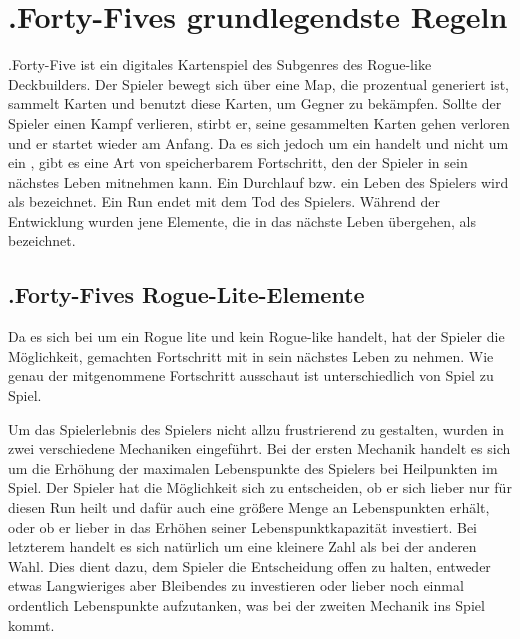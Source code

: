 
\section{.Forty-Fives grundlegendste Regeln}\label{sec:grundlegenste-regeln}

\renewcommand{\kapitelautor}{Autor: Philip Jankovic} %

%
.Forty-Five ist ein digitales Kartenspiel des Subgenres des Rogue-like Deckbuilders. %
Der Spieler bewegt sich über eine Map, die prozentual generiert ist, sammelt Karten und benutzt diese Karten,
um Gegner zu bekämpfen. Sollte der Spieler einen Kampf verlieren, stirbt er, seine gesammelten Karten
gehen verloren und er startet wieder am Anfang. Da es sich jedoch um ein  handelt und nicht um ein ,
gibt es eine Art von speicherbarem Fortschritt, den der Spieler in sein nächstes Leben mitnehmen kann.
Ein Durchlauf bzw. ein Leben des Spielers wird als  bezeichnet. Ein Run endet mit dem Tod des Spielers.
Während der Entwicklung wurden jene Elemente, die in das nächste Leben übergehen, als  bezeichnet.



\subsection{.Forty-Fives Rogue-Lite-Elemente}\label{rogue_lite_elemente}

Da es sich bei \FF um ein Rogue lite und kein Rogue-like handelt, hat der Spieler die Möglichkeit, gemachten Fortschritt mit in sein nächstes Leben zu nehmen.
Wie genau der mitgenommene Fortschritt ausschaut ist unterschiedlich von Spiel zu Spiel.


Um das Spielerlebnis des Spielers nicht allzu frustrierend zu gestalten, wurden in \FF zwei verschiedene Mechaniken eingeführt.
Bei der ersten Mechanik handelt es sich um die Erhöhung der maximalen Lebenspunkte des Spielers bei Heilpunkten im Spiel. Der Spieler hat die Möglichkeit
sich zu entscheiden, ob er sich lieber nur für diesen Run heilt und dafür auch eine größere Menge an Lebenspunkten erhält, oder ob er
lieber in das Erhöhen seiner Lebenspunktkapazität investiert. Bei letzterem handelt es sich natürlich um eine kleinere Zahl als bei der anderen Wahl.
Dies dient dazu, dem Spieler die Entscheidung offen zu halten, entweder etwas Langwieriges aber Bleibendes zu investieren oder lieber noch einmal ordentlich
Lebenspunkte aufzutanken, was bei der zweiten Mechanik ins Spiel kommt.

